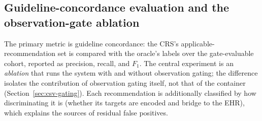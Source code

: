 \subsection{Guideline-concordance evaluation and the observation-gate ablation}
The primary metric is guideline concordance: the CRS's applicable-recommendation set is
compared with the oracle's labels over the gate-evaluable cohort, reported as precision,
recall, and $F_1$. The central experiment is an \emph{ablation} that runs the system with
and without observation gating; the difference isolates the contribution of observation
gating itself, not that of the container (Section~\ref{sec:csv-gating}). Each recommendation is additionally classified by how
discriminating it is (whether its targets are encoded and bridge to the EHR), which
explains the sources of residual false positives.

